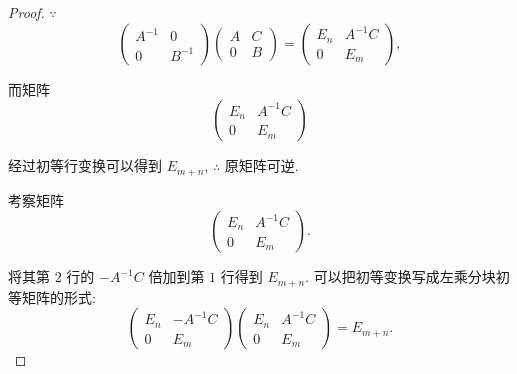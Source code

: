 \documentclass{ctexart}
\begin{document}
\begin{proof}
    $\because$
    \[\begin{pmatrix}
        A^{-1} & 0 \\
        0 & B^{-1}
    \end{pmatrix}\begin{pmatrix}
        A & C \\
        0 & B
    \end{pmatrix}=\begin{pmatrix}
        E_n & A^{-1}C \\
        0 & E_m
    \end{pmatrix},\]

    而矩阵
    \[\begin{pmatrix}
        E_n & A^{-1}C \\
        0 & E_m
    \end{pmatrix}\]

    经过初等行变换可以得到 $E_{m+n}$, $\therefore$ 原矩阵可逆.

    考察矩阵
    \[\begin{pmatrix}
        E_n & A^{-1}C \\
        0 & E_m
    \end{pmatrix}.\]

    将其第 $2$ 行的 $-A^{-1}C$ 倍加到第 $1$ 行得到 $E_{m+n}$. 可以把初等变换写成左乘分块初等矩阵的形式:
    \[\begin{pmatrix}
        E_n & -A^{-1}C \\
        0 & E_m
    \end{pmatrix}\begin{pmatrix}
        E_n & A^{-1}C \\
        0 & E_m
    \end{pmatrix}=E_{m+n}.\]


\end{proof}
\end{document}
